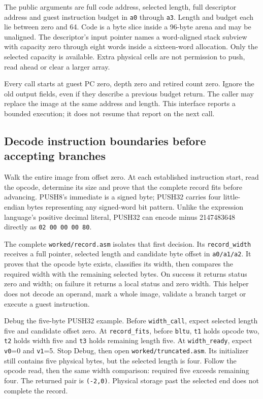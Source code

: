 

The public arguments are full code address, selected length, full descriptor
address and guest instruction budget in \texttt{a0} through \texttt{a3}.
Length and budget each lie between zero and 64. Code is a byte slice inside a
96-byte arena and may be unaligned. The descriptor's input pointer names a
word-aligned stack subview with capacity zero through eight words inside a
sixteen-word allocation. Only the selected capacity is available. Extra
physical cells are not permission to push, read ahead or clear a larger array.

Every call starts at guest PC zero, depth zero and retired count zero. Ignore
the old output fields, even if they describe a previous budget return. The
caller may replace the image at the same address and length. This interface
reports a bounded execution; it does not resume that report on the next call.

\subsection*{Decode instruction boundaries before accepting branches}



Walk the entire image from offset zero. At each established instruction start,
read the opcode, determine its size and prove that the complete record fits
before advancing. PUSH8's immediate is a signed byte; PUSH32 carries four
little-endian bytes representing any signed-word bit pattern. Unlike the
expression language's positive decimal literal, PUSH32 can encode minus
2147483648 directly as \texttt{02 00 00 00 80}.

The complete \texttt{worked/record.asm} isolates that first decision. Its
\texttt{record\_width} receives a full pointer, selected length and candidate byte
offset in \texttt{a0/a1/a2}. It proves that the opcode byte exists, classifies its
width, then compares the required width with the remaining selected bytes. On
success it returns status zero and width; on failure it returns a local status
and zero width. This helper does not decode an operand, mark a whole image,
validate a branch target or execute a guest instruction.

Debug the five-byte PUSH32 example. Before \texttt{width\_call}, expect selected
length five and candidate offset zero. At \texttt{record\_fits}, before
\texttt{bltu}, \texttt{t1} holds opcode two, \texttt{t2} holds width five and
\texttt{t3} holds remaining length five. At \texttt{width\_ready}, expect
\texttt{v0}=0 and \texttt{v1}=5. Stop Debug, then open
\texttt{worked/truncated.asm}. Its initializer still contains five physical
bytes, but the selected length is four. Follow the opcode read, then the same
width comparison: required five exceeds remaining four. The returned pair is
\texttt{(-2,0)}. Physical storage past the selected end does not complete the record.


